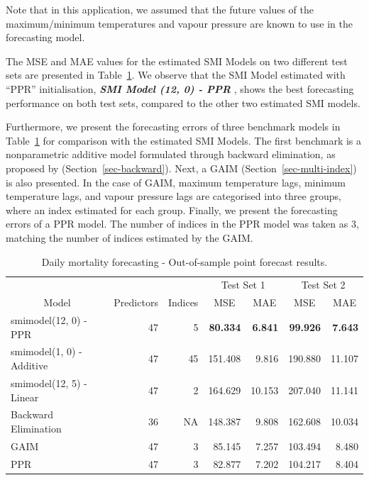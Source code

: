 \documentclass[11pt,a4paper,]{article}
\begin{document}
Note that in this application, we assumed that the future values of the
maximum/minimum temperatures and vapour pressure are known to use in the
forecasting model.

The MSE and MAE values for the estimated SMI Models on two different
test sets are presented in Table~\ref{tbl-heat}. We observe that the SMI
Model estimated with ``PPR'' initialisation, \textbf{\emph{SMI Model
(12, 0) - PPR }}, shows the best forecasting performance on both test
sets, compared to the other two estimated SMI models.

Furthermore, we present the forecasting errors of three benchmark models
in Table~\ref{tbl-heat} for comparison with the estimated SMI Models.
The first benchmark is a nonparametric additive model formulated through
backward elimination, as proposed by \textcite{FH2012}
(Section~\ref{sec-backward}). Next, a GAIM
(Section~\ref{sec-multi-index}) is also presented. In the case of GAIM,
maximum temperature lags, minimum temperature lags, and vapour pressure
lags are categorised into three groups, where an index estimated for
each group. Finally, we present the forecasting errors of a PPR model.
The number of indices in the PPR model was taken as 3, matching the
number of indices estimated by the GAIM.

\hypertarget{tbl-heat}{}
\begin{table}[!h]
\caption{\label{tbl-heat}Daily mortality forecasting - Out-of-sample point forecast results. }\tabularnewline

\centering
\begin{tabular}{lrr>{}r>{}r>{}r>{}r}
\toprule
\multicolumn{1}{c}{} & \multicolumn{1}{c}{} & \multicolumn{1}{c}{} & \multicolumn{2}{c}{Test Set 1} & \multicolumn{2}{c}{Test Set 2} \\
\cmidrule(l{3pt}r{3pt}){4-5} \cmidrule(l{3pt}r{3pt}){6-7}
\multicolumn{1}{c}{Model} & \multicolumn{1}{c}{Predictors} & \multicolumn{1}{c}{Indices} & \multicolumn{1}{c}{MSE} & \multicolumn{1}{c}{MAE} & \multicolumn{1}{c}{MSE} & \multicolumn{1}{c}{MAE}\\
\midrule
smimodel(12, 0) - PPR & 47 & 5 & \textbf{80.334} & \textbf{6.841} & \textbf{99.926} & \textbf{7.643}\\
smimodel(1, 0) - Additive & 47 & 45 & 151.408 & 9.816 & 190.880 & 11.107\\
smimodel(12, 5) - Linear & 47 & 2 & 164.629 & 10.153 & 207.040 & 11.141\\
Backward Elimination & 36 & NA & 148.387 & 9.808 & 162.608 & 10.034\\
GAIM & 47 & 3 & 85.145 & 7.257 & 103.494 & 8.480\\
\addlinespace
PPR & 47 & 3 & 82.877 & 7.202 & 104.217 & 8.404\\
\bottomrule
\end{tabular}
\end{table}
\end{document}

